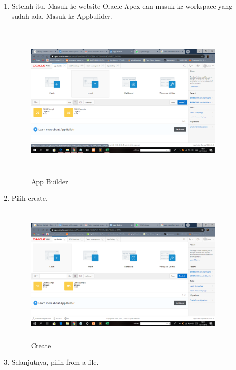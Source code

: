 \begin{enumerate}
\item Setelah itu, Masuk ke website Oracle Apex dan masuk ke workspace yang sudah ada. Masuk ke Appbulider.

\begin{figure}[!htbp]
\centering
\includegraphics[width=10cm,height=8cm]{figures/6appbuilder.png}
\caption{App Builder}
\label{penanda}
\end{figure}

\item Pilih create.

\begin{figure}[!htbp]
\centering
\includegraphics[width=10cm,height=7cm]{figures/7create.png}
\caption{Create}
\label{penanda}
\end{figure}

\item Selanjutnya, pilih from a file.


\end{enumerate}
